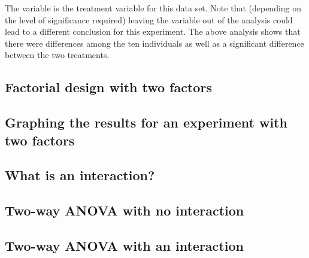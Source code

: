  
The  variable is the treatment variable for this data set. Note that (depending on the level of significance required) leaving the  variable out of the analysis could lead to a different conclusion for this experiment. The above analysis shows that there were differences among the ten individuals as well as a significant difference between the two treatments. 
 
 
\subsection{Factorial design with two factors} 
 
 
 
\subsection{Graphing the results for an experiment with two factors} 
 
\subsection{What is an interaction?} 
 
\subsection{Two-way ANOVA with no interaction} 
 
\subsection{Two-way ANOVA with an interaction} 
 

